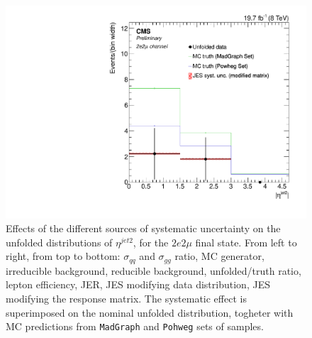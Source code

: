 \begin{figure}[hbtp]
\begin{center}
   \includegraphics[width=0.8\cmsFigWidth]{Figures/Unfolding/Systematics/ZZTo2e2m_EtaJet2_JES_ModMat_Mad_fr}
   \caption{Effects of the different sources of systematic uncertainty on the unfolded distributions of $\eta^{jet2}$, for the     
   $2e2\mu$ final state. From left to right, from top to bottom: $\sigma_{qq}$ and $\sigma_{gg}$ ratio, MC generator, irreducible background, reducible background, unfolded/truth ratio, lepton efficiency, JER, JES modifying data distribution, JES modifying the response matrix. The systematic effect is superimposed on the nominal unfolded distribution, togheter with MC predictions from \texttt{MadGraph} and \texttt{Pohweg} sets of samples.}
   \label{fig:EtaJet2syst2e2m}
 \end{center}
\end{figure}
